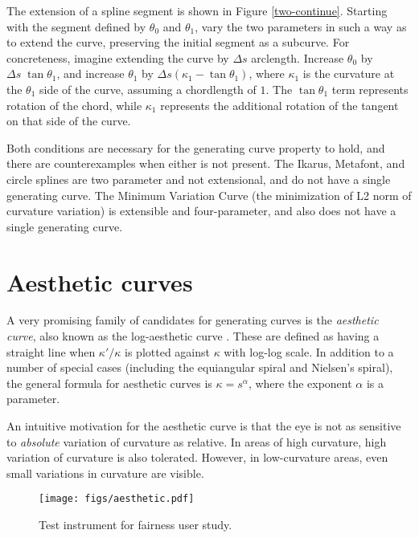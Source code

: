 \documentclass{article}
\begin{document}
The extension of a spline segment is shown in Figure
\ref{two-continue}. Starting with the segment defined by $\theta_0$
and $\theta_1$, vary
the two parameters in such a way as to extend the curve, preserving
the initial segment as a subcurve. For concreteness, imagine extending
the curve by $\Delta s$ arclength. Increase $\theta_0$ by $\Delta s \;
\tan \theta_1$, and increase $\theta_1$ by $\Delta s(\kappa_1 - \tan
\theta_1)$, where $\kappa_1$ is the curvature at the $\theta_1$ side of
the curve, assuming a chordlength of $1$. The $\tan \theta_1$ term
represents rotation of the chord, while $\kappa_1$ represents the
additional rotation of the tangent on that side of the curve.

Both conditions are necessary for the generating curve property to
hold, and there are counterexamples when either is not present. The
Ikarus, Metafont, and circle splines are two parameter and not
extensional, and do not have a single generating curve. The Minimum
Variation Curve (the minimization of L2 norm of curvature variation)
is extensible and four-parameter, and also does not have a single
generating curve.

\section{Aesthetic curves}

A very promising family of candidates for generating curves is the
\emph{aesthetic curve}, also known as the log-aesthetic curve
\cite{Miura05}. These are defined as having a straight line when
$\kappa' / \kappa$ is plotted against $\kappa$ with log-log scale. In
addition to a number of special cases (including the equiangular
spiral and Nielsen's spiral), the general formula for aesthetic curves
is $\kappa = s^\alpha$, where the exponent $\alpha$ is a parameter.

An intuitive motivation for the aesthetic curve is that the eye is not
as sensitive to \emph{absolute} variation of curvature as relative. In
areas of high curvature, high variation of curvature is also
tolerated. However, in low-curvature areas, even small variations in
curvature are visible.

\begin{figure*}[tbh]
\begin{center}
\texttt{[image: figs/aesthetic.pdf]}
\caption{\label{aesthetic-examples}Test instrument for fairness user study.}
\end{center}
\end{figure*}
\end{document}
